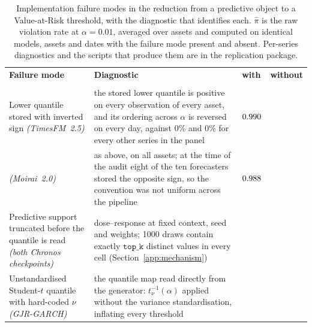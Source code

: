 \documentclass[preprint,11pt,authoryear]{elsarticle}
\newcommand{\1}{\boldsymbol{1}}
\begin{document}
\begin{table}[htbp]
	\centering
	\caption{Implementation failure modes in the reduction from a predictive
		object to a Value-at-Risk threshold, with the diagnostic that identifies
		each. $\hat\pi$ is the raw violation rate at $\alpha = 0.01$, averaged
		over \nMainAssets{} assets and computed on identical models, assets and
		dates with the failure mode present and absent. Per-series diagnostics
		and the scripts that produce them are in the replication package.}
	\label{tab:failure_modes_app}
	\footnotesize
	\setlength{\tabcolsep}{3pt}
	\renewcommand{\arraystretch}{1.15}
	\begin{tabular}{@{}>{\raggedright\arraybackslash}p{3.5cm}
			>{\raggedright\arraybackslash}p{5.6cm}
			>{\raggedleft\arraybackslash}p{1.3cm}
			>{\raggedleft\arraybackslash}p{1.3cm}@{}}
		\toprule
		& & \multicolumn{2}{c@{}}{$\hat\pi$ at $\alpha = 0.01$} \\
		\cmidrule(l){3-4}
		\textbf{Failure mode} & \textbf{Diagnostic} &
		\textbf{with} & \textbf{without} \\
		\midrule
		\multicolumn{4}{@{}l}{\emph{In the forecast-reduction step}}\\
		Lower quantile stored with inverted sign \emph{(TimesFM~2.5)}
		& the stored lower quantile is positive on every observation of every
		asset, and its ordering across $\alpha$ is reversed on every day, against
		0\% and 0\% for every other series in the panel
		& $0.990$ & \nRawPiTimesFM \\
		\hspace{1em}\emph{(Moirai~2.0)}
		& as above, on all \nMainAssets{} assets; at the time of the audit eight
		of the ten forecasters stored the opposite sign, so the convention was not
		uniform across the pipeline & $0.988$ & \nRawPiMoiraiTwo \\
		Predictive support truncated before the quantile is read
		\emph{(both Chronos checkpoints)}
		& dose--response at fixed context, seed and weights; 1000 draws contain
		exactly $\texttt{top\_k}$ distinct values in every cell
		(Section~\ref{app:mechanism})
		& \nPiSmallDefaultOne\newline \nPiMiniDefaultOne
		& \nPiSmallAnalyticOne\newline \nPiMiniAnalyticOne \\
		Unstandardised Student-$t$ quantile with hard-coded $\nu$
		\emph{(GJR-GARCH)}
		& the quantile map read directly from the generator: $t_\nu^{-1}(\alpha)$
		applied without the variance standardisation, inflating every threshold

\end{tabular}
\end{table}
\end{document}
